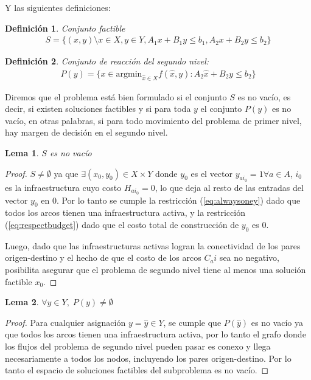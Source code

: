 \documentclass{article}
\newtheorem{definition}{Definición}
\newtheorem{lemma}{Lema}
\begin{document}
  Y las siguientes definiciones:

  \begin{definition}
    Conjunto factible
    \begin{align}
      S = \{(x, y) \setminus x \in X, y \in Y, A_1 x + B_1 y \leq b_1, A_2 x + B_2 y \leq b_2 \}
    \end{align}
  \end{definition}

  \begin{definition}
    Conjunto de reacción del segundo nivel:
    \begin{align}
      P(y) = \{ x \in \text{argmin}_{\hat{x} \in X} f(\hat{x}, y) : A_2 \hat{x} + B_2 y \leq b_2 \}
    \end{align}
  \end{definition}

  Diremos que el problema está bien formulado si el conjunto $S$ es no vacío, es decir, si existen soluciones factibles y si para toda $y$ el conjunto $P(y)$ es no vacío, en otras palabras, si para todo movimiento del problema de primer nivel, hay margen de decisión en el segundo nivel.

  \begin{lemma}$S$ es no vacío
  \end{lemma}

  \begin{proof}
    $S \neq \emptyset$ ya que $\exists (x_0, y_0) \in X \times Y$ donde $y_0$ es el vector $y_{ai_0} = 1 \forall a \in A$, $i_0$ es la infraestructura cuyo costo $H_{ai_0} = 0$, lo que deja al resto de las entradas del vector $y_0$ en $0$. Por lo tanto se cumple la restricción (\ref{eq:alwaysoney}) dado que todos los arcos tienen una infraestructura activa, y la restricción (\ref{eq:respectbudget}) dado que el costo total de construcción de $y_0$ es $0$.

    Luego, dado que las infraestructuras activas logran la conectividad de los pares origen-destino y el hecho de que el costo de los arcos $C_ai$ sea no negativo, posibilita asegurar que el problema de segundo nivel tiene al menos una solución factible $x_0$.
  \end{proof}

  \begin{lemma}$\forall y \in Y,\; P(y) \neq \emptyset$
  \end{lemma}

  \begin{proof}
    Para cualquier asignación $y = \hat{y} \in Y$, se cumple que $P(\hat{y})$ es no vacío ya que todos los arcos tienen una infraestructura activa, por lo tanto el grafo donde los flujos del problema de segundo nivel pueden pasar es conexo y llega necesariamente a todos los nodos, incluyendo los pares origen-destino. Por lo tanto el espacio de soluciones factibles del subproblema es no vacío. 
  \end{proof}
\end{document}
